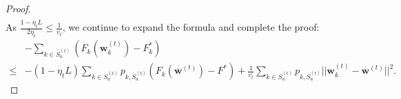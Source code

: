 \documentclass[10pt,journal,compsoc]{IEEEtran}
\newtheorem{proof}{Proof}[section]
\newcommand{\w}{\mathbf{w}}
\newcommand{\s}{S_a^{(t)}}
\begin{document}
\begin{proof}
\begin{equation}
\begin{split}
\end{split}
\end{equation}
As $\frac{1-\eta_tL}{2\eta_t} \leq \frac{1}{v_t}$, we continue to expand the formula and complete the proof:
\begin{equation}
\begin{split}
&-\sum_{k \in \s}(F_k(\w_k^{(t)}) - F_k^*) \\
\leq& -(1-\eta_tL)\sum_{k \in \s}p_{k,\s}(F_k(\overline{\w}^{(t)}) - F^*) + \frac{1}{v_t}\sum_{k\in \s}p_{k,\s}||\w_k^{(t)} - \overline{\w}^{(t)}||^2.
\end{split}
\end{equation}
\end{proof}
\end{document}
